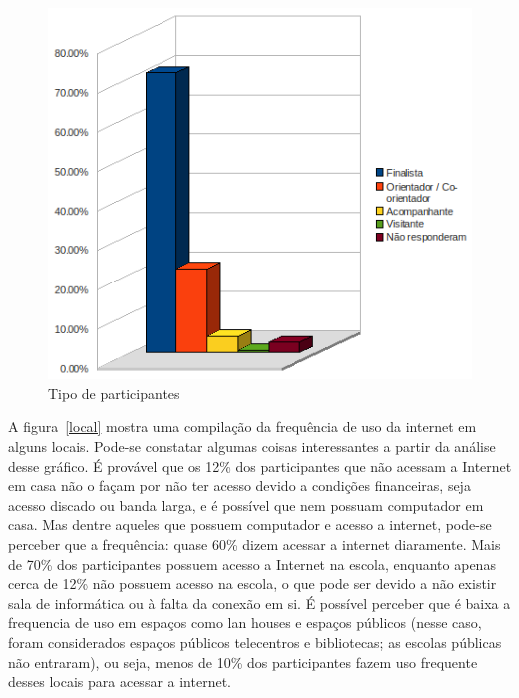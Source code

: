   \begin{figure}
      \begin{center}
	\includegraphics[width=0.7\linewidth]{arquivos/participante.png}
      \end{center}
      \caption{Tipo de participantes}
      \label{participante}
  \end{figure}

  A figura~\ref{local} mostra uma compilação da frequência de uso da internet em alguns locais. Pode-se constatar algumas coisas interessantes a partir 
da análise desse gráfico. É provável que os 12\% dos participantes que não acessam a Internet em casa não o façam por não ter acesso devido a 
condições financeiras, seja acesso discado ou banda larga, e é possível que nem possuam computador em casa. Mas dentre aqueles que possuem computador 
e acesso a internet, pode-se perceber que a frequência: quase 60\% dizem acessar a internet diaramente. Mais de 70\% dos participantes possuem 
acesso a Internet na escola, enquanto apenas cerca de 12\% não possuem acesso na escola, o que pode ser devido a não existir sala de informática 
ou à falta da conexão em si. É possível perceber que é baixa a frequencia de uso em espaços como lan houses e espaços públicos (nesse caso, foram 
considerados espaços públicos telecentros e bibliotecas; as escolas públicas não entraram), ou seja, menos de 10\% dos participantes fazem uso frequente 
desses locais para acessar a internet. 

